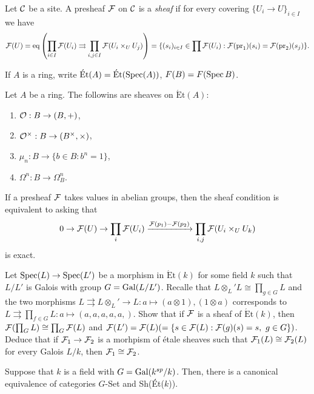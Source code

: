 \documentclass{../../../small}
\newcommand{\Et}{\mathrm{\acute Et}}
\begin{document}
\begin{defn*}
Let $\mathcal{C}$ be a site.
A presheaf $\mathcal{F}$ on $\mathcal{C}$ is a \emph{sheaf} if for every covering $\{U_i\to U\}_{i\in I}$ we have
\[\mathcal{F}(U)=\mathrm{eq}\left(\prod_{i\in I}\mathcal{F}(U_i)\rightrightarrows\prod_{i,j\in I}\mathcal{F}(U_i\times_UU_j)\right)=\{(s_i)_{i\in I}\in\prod\mathcal{F}(U_i):\mathcal{F}(\operatorname{pr}_1)(s_i)=\mathcal{F}(\operatorname{pr}_2)(s_j)\}.\]
\end{defn*}
\begin{rmk*}
If $A$ is a ring, write $\Et(A)=\Et(\Spec(A))$, $F(B)=F(\operatorname{Spec} B)$.
\end{rmk*}
\begin{ex*}
Let $A$ be a ring.
The followins are sheaves on $\mathrm{\acute Et}(A)$:
\begin{enumerate}[1)]
\item $\mathcal{O}:B\to(B,+)$,
\item $\mathcal{O}^\times:B\to (B^\times,\times)$,
\item $\mu_n:B\to\{b\in B:b^n=1\}$,
\item $\Omega^n:B\to\Omega_B^n$.
\end{enumerate}
\end{ex*}

\begin{rmk*}
If a presheaf $\mathcal{F}$ takes values in abelian groups, then the sheaf condition is equivalent to asking that
\[0\to\mathcal{F}(U)\to\prod_i\mathcal{F}(U_i)\xrightarrow{\mathcal{F}(p_1)-\mathcal{F}(p_2)}\prod_{i,j}\mathcal{F}(U_i\times_UU_k)\]
is exact.
\end{rmk*}

\begin{exe*}
Let $\operatorname{Spec}(L)\to\operatorname{Spec}(L')$ be a morphism in $\Et(k)$ for some field $k$ such that $L/L'$ is Galois with group $G=\operatorname{Gal}(L/L')$.
Recalle that $L\otimes_L'L\cong\prod_{g\in G}L$ and the two morphisms $L\rightrightarrows L\otimes_L'\to L:a\mapsto(a\otimes1),(1\otimes a)$ corresponds to $L\rightrightarrows\prod_{f\in G}L:a\mapsto(a,a,a,a,a,)$.
Show that if $\mathcal{F}$ is a sheaf of $\Et(k)$, then $\mathcal{F}(\prod_GL)\cong\prod_G\mathcal{F}(L)$ and $\mathcal{F}(L')=\mathcal{F}(L)(=\{s\in\mathcal{F}(L):\mathcal{F}(g)(s)=s,\ g\in G\})$.
Deduce that if $\mathcal{F}_1\to\mathcal{F}_2$ is a morhpism of \'etale sheaves such that $\mathcal{F}_1(L)\cong\mathcal{F}_2(L)$ for every Galois $L/k$, then $\mathcal{F}_1\cong\mathcal{F}_2$.
\end{exe*}

\begin{thm*}[Milne, II.1.9]
Suppose that $k$ is a field with $G=\operatorname{Gal}(k^{sp}/k)$.
Then, there is a canonical equivalence of categories $G$-Set and Sh(\'Et($k$)).
\end{thm*}
\end{document}
